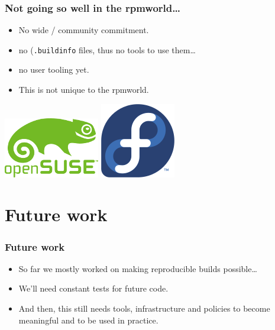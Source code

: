 \documentclass[14pt,aspectratio=169]{beamer}
\begin{document}
\begin{frame}
 \frametitle{Not going so well in the rpmworld…}
 \begin{itemize}
	 \item No wide / community commitment.
	 \item<2-3> no (\texttt{.buildinfo} files, thus no tools to use them…
	 \item<2-3> no user tooling yet.	 
	\item<3> This is not unique to the rpmworld.
  \end{itemize}
 \begin{center}
  \includegraphics[height=0.1\paperheight]{images/openSUSE.png}
  \hspace{0.1\paperwidth}
 \includegraphics[height=0.1\paperheight]{images/fedora.png}
  \hspace{0.1\paperwidth}
 \end{center}

\end{frame}





\section{Future work}

\begin{frame}
 \frametitle{Future work}
 \begin{itemize}
 \item<1-3> So far we mostly worked on making reproducible builds possible…
 \item<2-3> We'll need constant tests for future code.
 \item<3> And then, this still needs tools, infrastructure and policies to become
 meaningful and to be used in practice.
 \end{itemize}
\end{frame}
\end{document}
